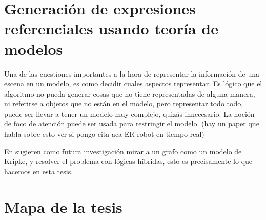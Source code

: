 


\section{Generaci\'on de expresiones referenciales usando teor\'ia de modelos}
\label{sec:gre-teoria-modelos}

Una de las cuestiones importantes a la hora de representar la informaci\'on de una escena en un modelo, es como decidir cuales aspectos representar.
Es l\'ogico que el algoritmo no pueda generar cosas que no tiene representadas de alguna manera, ni referirse a objetos que no est\'an en el modelo, pero representar todo todo, puede ser llevar a tener un modelo muy complejo, quiz\'as innecesario. La noci\'on de foco de atenci\'on puede ser usada para restringir el modelo. (hay un paper que habla sobre esto ver si pongo cita aca-ER robot en tiempo real)

En \cite{survey} sugieren como futura investigaci\'on mirar a un grafo como un modelo de Kripke, y resolver el problema con l\'ogicas h\'ibridas, esto es precisamente lo que hacemos en esta tesis. 

\section{Mapa de la tesis}
\label{sec:mapadetesis}
